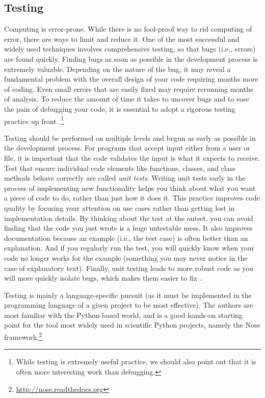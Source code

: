 \documentclass[ChapterTOCs,krantz2]{krantz} %
\begin{document}
\subsection{Testing}

Computing is error-prone. While there is no fool-proof way to rid computing of
error, there are ways to limit and reduce it. One of the most successful and
widely used techniques involves comprehensive testing, so that bugs (i.e.,
errors) are found quickly.  Finding bugs as soon as possible in the development
process is extremely valuable.  Depending on the nature of the bug, it may
reveal a fundamental problem with the overall design of your code requiring
months more of coding.  Even small errors that are easily fixed may require
rerunning months of analysis.  To reduce the amount of time it takes
to uncover bugs and to ease the pain of debugging your code, it is essential to
adopt a rigorous testing practice up front.%
\footnote{While testing is extremely useful
practice, we should also point out that it is often more interesting work
than debugging.}

Testing should be performed on multiple levels and begun as early as possible
in the development process.  For programs that accept input either from a user
or file, it is important that the code validates the input is what
it expects to receive. Test that ensure individual code elements like functions,
classes, and class methods behave correctly are called \emph{unit tests}. 
Writing unit tests early in the process of implementing new functionality
helps you think about what you want a piece of code to do, rather than just how
it does it. This practice improves code quality by focusing your attention
on use cases rather than getting lost in implementation details. By thinking
about the test at the outset, you can avoid finding that the code you just
wrote is a huge untestable mess. It also improves documentation because an
example (i.e., the test case) is often better than an explanation. And if you
regularly run the test, you will quickly know when your code no longer works
for the example (something you may never notice in the case of explanatory
text). Finally, unit testing leads to more robust code as you will more quickly
isolate bugs, which makes them easier to fix \cite{oram2010making}.

Testing is mainly a language-specific pursuit (as it must be implemented in the
programming language of a given project to be most effective).  The authors are
most familiar with the Python-based world, and \cite{ctb-nose:2006} is a good
hands-on starting point for the tool most widely used in scientific Python
projects, namely the Nose
framework.\footnote{\url{http://nose.readthedocs.org}}
\end{document}
